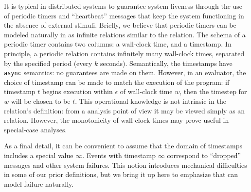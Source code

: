 It is typical in distributed systems to guarantee system liveness through the use of periodic timers and ``heartbeat'' messages that keep the system functioning in the absence of external stimuli.  Briefly, we believe that periodic timers can be modeled naturally in \lang as infinite relations similar to the \lang {} relation.  The schema of a periodic timer contains two columns: a wall-clock time, and a \lang timestamp.  In principle, a periodic relation contains infinitely many wall-clock times, separated by the specified period (every $k$ seconds).  Semantically, the \lang timestamps have {\tt async} semantics: no guarantees are made on them.  However, in an evaluator, the choice of timestamp can be made to match the execution of the program: if \lang timestamp $t$ begins execution within $\epsilon$ of wall-clock time $w$, then the \lang timestep for $w$ will be chosen to be $t$.  This operational knowledge is not intrinsic in the relation's definition: from a \lang analysis point of view it may be viewed simply as an  relation.  However, the monotonicity of wall-clock times may prove useful in special-case analyses.

As a final detail, it can be convenient to assume that the domain of \lang timestamps includes a special value $\infty$.  Events with  timestamp $\infty$ correspond to ``dropped'' messages and other system failures.  This notion introduces mechanical difficulties in some of our prior definitions, but we bring it up here to emphasize that \lang can model failure naturally.